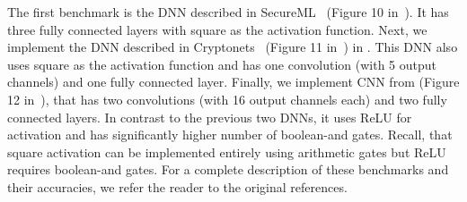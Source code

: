 The first benchmark  is the DNN described in
SecureML~\cite{secureml} (Figure 10 in~\cite{minionn}).
It has three fully connected layers with square as the activation function.
Next, we implement the DNN described in Cryptonets~\cite{cryptonets} (Figure 11 in~\cite{minionn})
in \tool.
This DNN also uses square as the activation function and has one
convolution (with 5 output channels) and one fully connected layer. 
Finally, we implement CNN from \minion (Figure 12 in~\cite{minionn}), that has
two convolutions (with 16 output channels each) and two fully
connected layers.  In contrast to the previous two DNNs, it uses
ReLU for activation and
has significantly higher number of boolean-and gates.
Recall, that square activation can be implemented entirely using
arithmetic gates but ReLU requires boolean-and gates.  For a complete
description of these benchmarks and their accuracies, we refer the
reader to the original references. 



%

